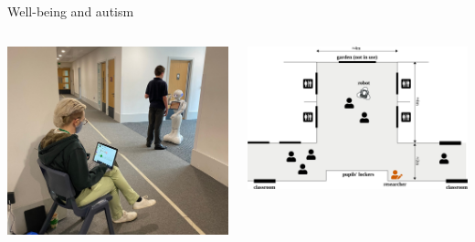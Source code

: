 \documentclass[xcolor=table]{beamer}
\begin{document}
{

\begin{frame}{Well-being and autism}
    \begin{columns}
        \begin{column}{0.5\linewidth}
            \begin{center}
                \includegraphics[width=\linewidth]{figs/robots4sen/location.jpg}
            \end{center}
        \end{column}
        \begin{column}{0.5\linewidth}
            \begin{center}
                \includegraphics[width=\linewidth]{figs/robots4sen/setup}
            \end{center}
        \end{column}
    \end{columns}
\end{frame}

}
\end{document}
